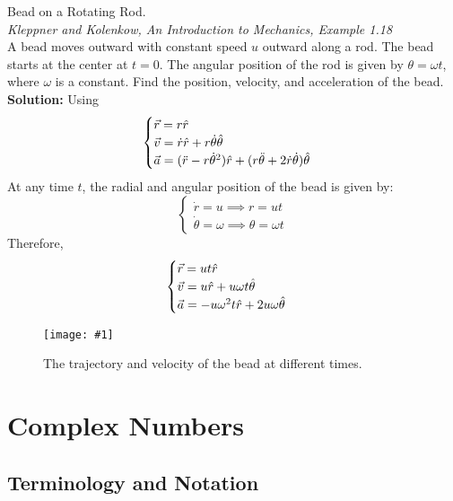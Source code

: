 \documentclass[11pt]{article}
\newcommand{\fig}[4]{
    \begin{figure}[H]
        \centering
        \texttt{[image: \#1]}
        \caption{#2}
        \label{exp4fit}
    \end{figure}
}
\theoremstyle{gangnamstyle}{\newtheorem{definition}{Definition}[]}
\theoremstyle{gangnamstyle}{\newtheorem{example}{Example}[]}
\theoremstyle{gangnamstyle}{\newtheorem{problem}{Problem}[]}
\begin{document}
\begin{example}
Bead on a Rotating Rod. \\ 
\textit{Kleppner and Kolenkow, An Introduction to Mechanics, Example 1.18} \\
A bead moves outward with constant speed $u$ outward along a rod. The bead starts at the center at $t = 0$. The angular position of the rod is given by $\theta = \omega t$, where $\omega$ is a constant. Find the position, velocity, and acceleration of the bead. \\

\textbf{Solution:} Using
\[ \begin{cases}
\Vec{r} = r\Hat{r} \\
\Vec{v} = \Dot{r}\Hat{r} + r\Dot{\theta}\Hat{\theta} \\
\Vec{a} = (\Ddot{r} - r\Dot{\theta}^2)\Hat{r} + (r\Ddot{\theta} + 2\Dot{r}\Dot{\theta})\Hat{\theta}
\end{cases}\]
At any time $t$, the radial and angular position of the bead is given by: 
\[ \begin{cases}
\Dot{r} = u \implies r = ut \\
\Dot{\theta} = \omega \implies\theta = \omega t
\end{cases} \]
Therefore, 
\[ \begin{cases}
\Vec{r} = ut\Hat{r} \\
\Vec{v} = u\Hat{r} + u\omega t\Hat{\theta} \\
\Vec{a} = -u\omega^2t\Hat{r} + 2u\omega\Hat{\theta}
\end{cases} \]

\fig{figs/n0/ex1.jpg}{The trajectory and velocity of the bead at different times.}{0.5}{0}
\end{example}

\pagebreak

\section{Complex Numbers}

\subsection{Terminology and Notation}
\end{document}
